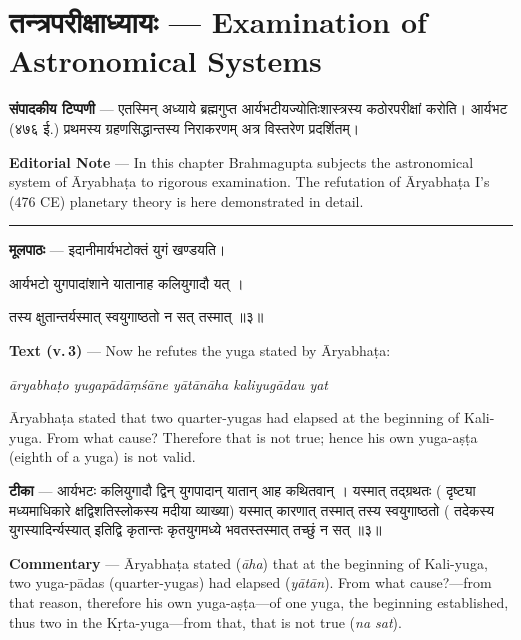 \documentclass[11pt,a4paper]{article}
\newcommand{\dev}[1]{{\devanagarifont #1}}
\newcommand{\skt}[1]{{\devanagarifont\color{sktcolor} #1}}
\newenvironment{bilingual}{%
  \par\noindent
  \begin{minipage}[t]{0.47\textwidth}%
}{%
  \par\end{minipage}%
}
\newcommand{\rightcol}{%
  \par\end{minipage}%
  \hfill
  \begin{minipage}[t]{0.47\textwidth}%
}
\begin{document}
\newpage
\section[\dev{तन्त्रपरीक्षाध्यायः}]{\dev{तन्त्रपरीक्षाध्यायः} --- Examination of Astronomical Systems}

\begin{bilingual}
\textbf{संपादकीय टिप्पणी} --- एतस्मिन् अध्याये ब्रह्मगुप्त आर्यभटीयज्योतिःशास्त्रस्य कठोरपरीक्षां करोति। आर्यभट (४७६ ई.) प्रथमस्य ग्रहणसिद्धान्तस्य निराकरणम् अत्र विस्तरेण प्रदर्शितम्।
\rightcol
\textbf{Editorial Note} --- In this chapter Brahmagupta subjects the astronomical system of Āryabhaṭa to rigorous examination. The refutation of Āryabhaṭa I's (476 CE) planetary theory is here demonstrated in detail.
\end{bilingual}

\medskip
\noindent\rule{\textwidth}{0.4pt}

\begin{bilingual}
\textbf{मूलपाठः} --- \skt{इदानीमार्यभटोक्तं युगं खण्डयति}।

\skt{आर्यभटो युगपादांशाने यातानाह कलियुगादौ यत्} ।

\skt{तस्य क्षुतान्तर्यस्मात् स्वयुगाष्ठतो न सत् तस्मात्} ॥३॥
\rightcol
\textbf{Text (v.\,3)} --- Now he refutes the yuga stated by Āryabhaṭa:

\textit{āryabhaṭo yugapādāṃśāne yātānāha kaliyugādau yat}

Āryabhaṭa stated that two quarter-yugas had elapsed at the beginning of Kali-yuga. From what cause? Therefore that is not true; hence his own yuga-aṣṭa (eighth of a yuga) is not valid.
\end{bilingual}

\medskip

\begin{bilingual}
\textbf{टीका} --- \skt{आर्यभटः कलियुगादौ द्विन् युगपादान् यातान् आह कथितवान् । यस्मात् तद्ग्रथतः} (\skt{दृष्ट्या मध्यमाधिकारे क्षद्विशतिस्लोकस्य मदीया व्याख्या}) \skt{यस्मात् कारणात् तस्मात् तस्य स्वयुगाष्ठतो} (\skt{तदेकस्य युगस्यादिर्न्यस्यात् इतिद्वि कृतान्तः कृतयुगमध्ये भवतस्तस्मात् तच्छुं न सत्} ॥३॥
\rightcol
\textbf{Commentary} --- Āryabhaṭa stated (\textit{āha}) that at the beginning of Kali-yuga, two yuga-pādas (quarter-yugas) had elapsed (\textit{yātān}). From what cause?---from that reason, therefore his own yuga-aṣṭa---of one yuga, the beginning established, thus two in the Kṛta-yuga---from that, that is not true (\textit{na sat}).
\end{bilingual}
\end{document}
